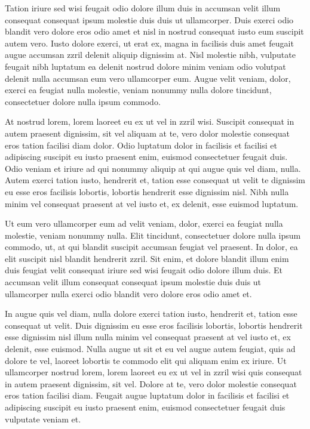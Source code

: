 Tation iriure sed wisi feugait odio dolore illum duis in accumsan velit illum consequat consequat ipsum molestie duis duis ut ullamcorper. Duis exerci odio blandit vero dolore eros odio amet et nisl in nostrud consequat iusto eum suscipit autem vero. Iusto dolore exerci, ut erat ex, magna in facilisis duis amet feugait augue accumsan zzril delenit aliquip dignissim at. Nisl molestie nibh, vulputate feugait nibh luptatum ea delenit nostrud dolore minim veniam odio volutpat delenit nulla accumsan eum vero ullamcorper eum. Augue velit veniam, dolor, exerci ea feugiat nulla molestie, veniam nonummy nulla dolore tincidunt, consectetuer dolore nulla ipsum commodo.

At nostrud lorem, lorem laoreet eu ex ut vel in zzril wisi. Suscipit consequat in autem praesent dignissim, sit vel aliquam at te, vero dolor molestie consequat eros tation facilisi diam dolor. Odio luptatum dolor in facilisis et facilisi et adipiscing suscipit eu iusto praesent enim, euismod consectetuer feugait duis. Odio veniam et iriure ad qui nonummy aliquip at qui augue quis vel diam, nulla. Autem exerci tation iusto, hendrerit et, tation esse consequat ut velit te dignissim eu esse eros facilisis lobortis, lobortis hendrerit esse dignissim nisl. Nibh nulla minim vel consequat praesent at vel iusto et, ex delenit, esse euismod luptatum.

Ut eum vero ullamcorper eum ad velit veniam, dolor, exerci ea feugiat nulla molestie, veniam nonummy nulla. Elit tincidunt, consectetuer dolore nulla ipsum commodo, ut, at qui blandit suscipit accumsan feugiat vel praesent. In dolor, ea elit suscipit nisl blandit hendrerit zzril. Sit enim, et dolore blandit illum enim duis feugiat velit consequat iriure sed wisi feugait odio dolore illum duis. Et accumsan velit illum consequat consequat ipsum molestie duis duis ut ullamcorper nulla exerci odio blandit vero dolore eros odio amet et.

In augue quis vel diam, nulla dolore exerci tation iusto, hendrerit et, tation esse consequat ut velit. Duis dignissim eu esse eros facilisis lobortis, lobortis hendrerit esse dignissim nisl illum nulla minim vel consequat praesent at vel iusto et, ex delenit, esse euismod. Nulla augue ut sit et eu vel augue autem feugiat, quis ad dolore te vel, laoreet lobortis te commodo elit qui aliquam enim ex iriure. Ut ullamcorper nostrud lorem, lorem laoreet eu ex ut vel in zzril wisi quis consequat in autem praesent dignissim, sit vel. Dolore at te, vero dolor molestie consequat eros tation facilisi diam. Feugait augue luptatum dolor in facilisis et facilisi et adipiscing suscipit eu iusto praesent enim, euismod consectetuer feugait duis vulputate veniam et.

